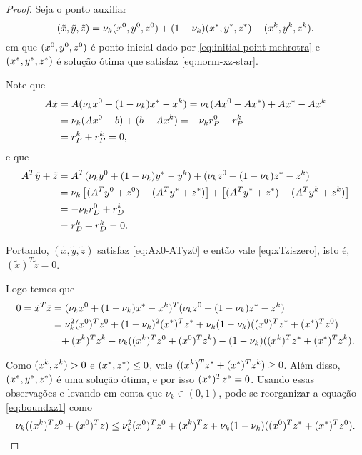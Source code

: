 \begin{proof}
	Seja o ponto auxiliar
	\[
		(\tilde{x},\tilde{y},\tilde{z})  = \nu_k(x^0,y^0,z^0) + (1-\nu_k)(x^*,y^*,z^*) - (x^{k},y^{k},z^{k}). 
	\]
em que $(x^0,y^0,z^0)$ é ponto inicial dado por \eqref{eq:initial-point-mehrotra} e $(x^*,y^*,z^*)$ é  solução ótima que satisfaz \eqref{eq:norm-xz-star}.


Note que 
\[
\begin{aligned}
A\tilde{x} & = A(\nu_kx^0+ (1-\nu_k)x^* -x^{k}) = \nu_k(Ax^0 - Ax^*) + Ax^* - Ax^{k}   \\
& = \nu_k(Ax^0 - b) + (b - Ax^{k}) = -\nu_k r_{P}^{0} + r_{P}^{k}  \\
 & =r_{P}^{k} + r_{P}^{k} = 0,  
\end{aligned}
\]
e que
\[
\begin{aligned}
A^{T}\tilde{y} + \tilde{z}  & = 	A^{T}(\nu_ky^0 + (1-\nu_k)y^* - y^{k}) + (\nu_kz^0 + (1-\nu_k)z^* - z^{k}) \\
							&  =  \nu_k \left[(A^{T}y^0  +z^0)  - (A^{T}y^*  +z^*)  \right]+  \left[(A^{T}y^*  +z^*)  - (A^{T}y^{k}  +z^{k})  \right]  \\
							& = -\nu_k r_{D}^{0} + r_{D}^{k}  \\
 & =r_{D}^{k} + r_{D}^{k} = 0.   
\end{aligned}
\]


Portando, $(\tilde{x},\tilde{y},\tilde{z})$  satisfaz \eqref{eq:Ax0-ATyz0} e então vale \eqref{eq:xTziszero}, isto é, $(\tilde{x})^{T}\tilde{z} = 0$. 

Logo temos que 
\begin{align}
	0  = \tilde{x}^{T}\tilde{z} & = (\nu_k\xzero + (1-\nu_k)\xstar -\xk)^{T}(\nu_k\zzero + (1-\nu_k)\zstar -\zk)\notag\\
	  & = \nu_k^{2}(\xzero)^T\zzero + (1-\nu_k)^{2}(\xstar)^{T}\zstar + \nu_k(1-\nu_k)((\xzero)^{T}\zstar + (\xstar)^{T}\zzero) \notag\\
	  & \textcolor{white}{=} +(\xk)^{T}\zk - \nu_k ((\xk)^{T}\zzero + (\xzero)^{T}\zk) - (1-\nu_k) ((\xk)^{T}\zstar + (\xstar)^{T}\zk).\label{eq:boundxz1}
\end{align}

Como  $(x^{k},z^{k})>0$ e $(x^*,z^*)\leq 0$, vale $((x^{k})^{T}z^* + (x^*)^{T}z^{k}) \geq 0$. Além disso, $(x^*,y^*,z^*)$ é uma solução ótima, e por isso $(x^*)^{T}z^* = 0$. Usando essas observações e levando em conta que $\nu_k\in(0,1)$,  pode-se reorganizar  a equação \eqref{eq:boundxz1} como
\begin{equation}
	\label{eq:xTzero+xzeroTz}
	  \nu_k ((x^{k})^{T}z^0 + (x^0)^{T}z) \leq 
  \nu_k^{2}(x^0)^Tz^0  + (x^{k})^{T}z+  \nu_k(1-\nu_k)((x^0)^{T}z^* + (x^*)^{T}z^0).
\end{equation}


\end{proof}
